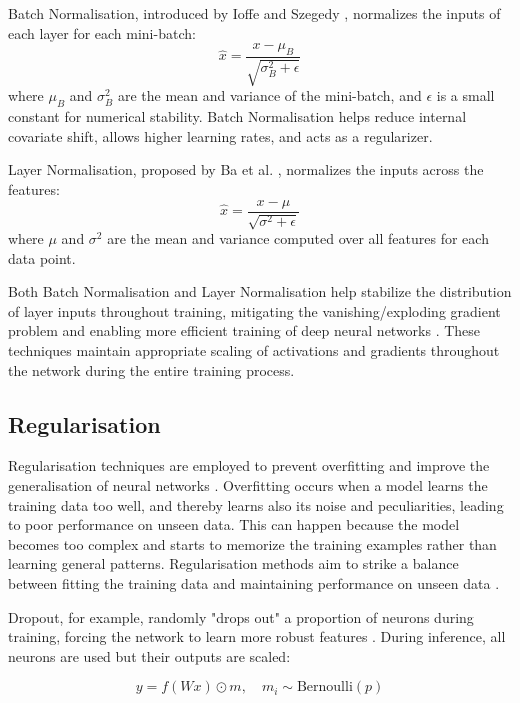 \documentclass[a4paper, oneside]{discothesis}
\begin{document}
Batch Normalisation, introduced by Ioffe and Szegedy \cite{ioffe2015batch}, normalizes the inputs of each layer for each mini-batch:
\begin{equation}
    \hat{x} = \frac{x - \mu_B}{\sqrt{\sigma_B^2 + \epsilon}}
\end{equation}
where $\mu_B$ and $\sigma_B^2$ are the mean and variance of the mini-batch, and $\epsilon$ is a small constant for numerical stability. Batch Normalisation helps reduce internal covariate shift, allows higher learning rates, and acts as a regularizer.

Layer Normalisation, proposed by Ba et al. \cite{ba2016layer}, normalizes the inputs across the features:
\begin{equation}
    \hat{x} = \frac{x - \mu}{\sqrt{\sigma^2 + \epsilon}}
\end{equation}
where $\mu$ and $\sigma^2$ are the mean and variance computed over all features for each data point.

Both Batch Normalisation and Layer Normalisation help stabilize the distribution of layer inputs throughout training, mitigating the vanishing/exploding gradient problem and enabling more efficient training of deep neural networks \cite{santurkar2019does}. These techniques maintain appropriate scaling of activations and gradients throughout the network during the entire training process.

\subsection{Regularisation}

Regularisation techniques are employed to prevent overfitting and improve the generalisation of neural networks \cite{goodfellow2016deep}. Overfitting occurs when a model learns the training data too well, and thereby learns also its noise and peculiarities, leading to poor performance on unseen data. This can happen because the model becomes too complex and starts to memorize the training examples rather than learning general patterns. Regularisation methods aim to strike a balance between fitting the training data and maintaining performance on unseen data \cite{bishop2006pattern}.

Dropout, for example, randomly "drops out" a proportion of neurons during training, forcing the network to learn more robust features \cite{dropout}. During inference, all neurons are used but their outputs are scaled:

\begin{equation}
    y = f(Wx) \odot m, \quad m_i \sim \text{Bernoulli}(p)
\end{equation}
\end{document}

